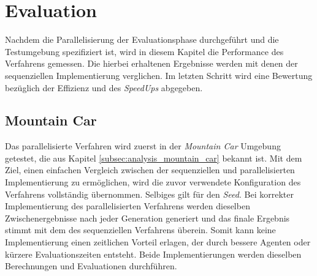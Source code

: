 \section{Evaluation}
Nachdem die Parallelisierung der Evaluationsphase durchgeführt und die Testumgebung spezifiziert ist, wird in diesem Kapitel die Performance des Verfahrens gemessen. Die hierbei erhaltenen Ergebnisse werden mit denen der sequenziellen Implementierung verglichen. Im letzten Schritt wird eine Bewertung bezüglich der Effizienz und des \emph{SpeedUps} abgegeben.

\subsection{Mountain Car}
\label{subsec:mountain_car_optimzation}
Das parallelisierte Verfahren wird zuerst in der \emph{Mountain Car} Umgebung getestet, die aus Kapitel \ref{subsec:analysis_mountain_car} bekannt ist. Mit dem Ziel, einen einfachen Vergleich zwischen der sequenziellen und parallelisierten Implementierung zu ermöglichen, wird die zuvor verwendete Konfiguration des Verfahrens vollständig übernommen. Selbiges gilt für den \emph{Seed}. Bei korrekter Implementierung des parallelisierten Verfahrens werden dieselben Zwischenergebnisse nach jeder Generation generiert und das finale Ergebnis stimmt mit dem des sequenziellen Verfahrens überein. Somit kann keine Implementierung einen zeitlichen Vorteil erlagen, der durch bessere Agenten oder kürzere Evaluationszeiten entsteht. Beide Implementierungen werden dieselben Berechnungen und Evaluationen durchführen.
